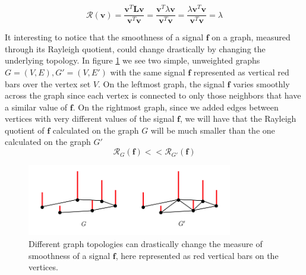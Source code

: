 \begin{equation}\label{eq:lambda}
	\mathcal R(\mathbf v) = \frac{\mathbf v^T\mathbf L\mathbf v}{\mathbf v^T\mathbf v} =\frac{\mathbf{v}^T\lambda\mathbf v}{\mathbf v^T\mathbf v} = \frac{\lambda\mathbf{v}^T\mathbf v}{\mathbf v^T\mathbf v}  = \lambda
\end{equation}
\vspace{0.5cm}
\begin{remark}
	It interesting to notice that the smoothness of a signal $\mathbf f$ on a graph, measured through its Rayleigh quotient, could change drastically by changing the underlying topology. In figure \ref{fig:graph} we see two simple, unweighted graphs $G=(V, E), G' =(V, E')$ with the same signal $\mathbf f$ represented as vertical red bars over the vertex set $V$. On the leftmost graph, the signal $\mathbf f$ varies smoothly across the graph since each vertex is connected to only those neighbors that have a similar value of $\mathbf f$. On the rightmost graph, since we added edges between vertices with very different values of the signal $\mathbf f$, we will have that the Rayleigh quotient of $\mathbf f$ calculated on the graph $G$ will be much smaller than the one calculated on the graph $G'$
	$$
	\mathcal R_{G}(\mathbf f) << \mathcal R_{G'}(\mathbf f)
	$$
\end{remark}
\begin{figure}
	\centering
	\includegraphics[width=0.8\textwidth]{figs/chapter1/graph.png}
	\caption{\label{fig:graph}Different graph topologies can drastically change the measure of smoothness of a signal $\mathbf f$, here represented as red vertical bars on the vertices.}
\end{figure}

